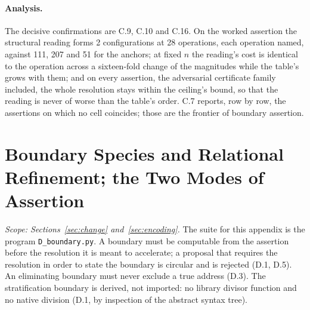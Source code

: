 \documentclass[pdflatex,sn-mathphys-num]{sn-jnl}
\theoremstyle{thmstyleone}%
\theoremstyle{thmstyletwo}%
\theoremstyle{thmstylethree}%
\newcommand{\workedSurveyOps}{111}
\newcommand{\workedTableOps}{207}
\newcommand{\workedMitmOps}{51}
\newcommand{\workedStructOps}{28}
\newcommand{\workedStructFormed}{2}
\begin{document}
\begin{appendices}
\paragraph{Analysis.} The decisive confirmations are C.9, C.10 and C.16. On the worked assertion the structural reading forms \workedStructFormed{} configurations at \workedStructOps{} operations, each operation named, against \workedSurveyOps{}, \workedTableOps{} and \workedMitmOps{} for the anchors; at fixed $n$ the reading's cost is identical to the operation across a sixteen-fold change of the magnitudes while the table's grows with them; and on every assertion, the adversarial certificate family included, the whole resolution stays within the ceiling's bound, so that the reading is never of worse than the table's order. C.7 reports, row by row, the assertions on which no cell coincides; those are the frontier of boundary assertion.

\section{Boundary Species and Relational Refinement; the Two Modes of Assertion}\label{app:D}
\emph{Scope: Sections~\ref{sec:change} and~\ref{sec:encoding}.} The suite for this appendix is the program \texttt{D\_boundary.py}. A boundary must be computable from the assertion before the resolution it is meant to accelerate; a proposal that requires the resolution in order to state the boundary is circular and is rejected (D.1, D.5). An eliminating boundary must never exclude a true address (D.3). The stratification boundary is derived, not imported: no library divisor function and no native division (D.1, by inspection of the abstract syntax tree).


\end{appendices}
\end{document}
